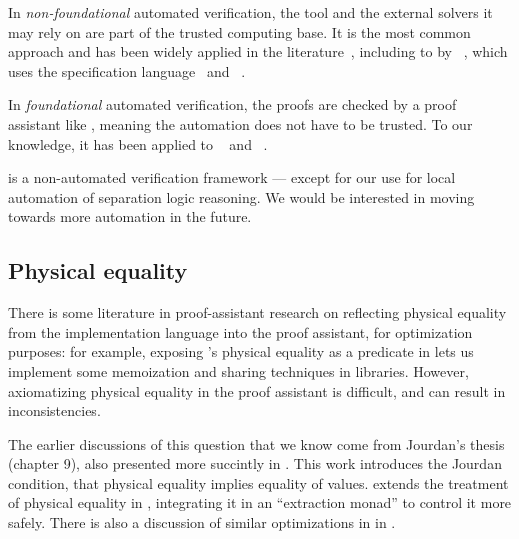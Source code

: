 In \emph{non-foundational} automated verification, the tool and the external solvers it may rely on are part of the trusted computing base.
It is the most common approach and has been widely applied in the literature~\cite{DBLP:journals/jfp/SwamyCFSBY13, DBLP:series/natosec/0001SS17, DBLP:conf/nfm/JacobsSPVPP11, DBLP:conf/icfem/DenisJM22, DBLP:conf/nfm/AstrauskasBFGMM22, DBLP:conf/esop/FilliatreP13, DBLP:journals/pacmpl/LattuadaHCBSZHPH23, DBLP:journals/pacmpl/PulteMSMSK23}, including to \OCaml by \Cameleer~\cite{DBLP:conf/cav/PereiraR20}, which uses the \Gospel specification language~\cite{DBLP:conf/fm/ChargueraudFLP19} and \WhyThree~\cite{DBLP:conf/esop/FilliatreP13}.

In \emph{foundational} automated verification, the proofs are checked by a proof assistant like \Rocq, meaning the automation does not have to be trusted.
To our knowledge, it has been applied to \C~\cite{DBLP:conf/pldi/SammlerLKMD021} and \Rust~\cite{DBLP:journals/pacmpl/GaherSJKD24}.

\Zoo is a non-automated verification framework --- except for our use \Diaframe for local automation of separation logic reasoning. We would be interested in moving towards more automation in the future.

\subsection{Physical equality}
\label{subsec:related-work-physical-equality}

There is some literature in proof-assistant research on reflecting physical equality from the implementation language into the proof assistant, for optimization purposes: for example, exposing \OCaml's physical equality as a predicate in \Rocq lets us implement some memoization and sharing techniques in \Rocq libraries.
%
However, axiomatizing physical equality in the proof assistant is difficult, and can result in inconsistencies.

The earlier discussions of this question that we know come from Jourdan's thesis~\cite{DBLP:phd/hal/Jourdan16} (chapter 9), also presented more succintly in \cite{DBLP:journals/jar/BraibantJM14}.
%
This work introduces the Jourdan condition, that physical equality implies equality of values.
%
\cite{boulme:tel-03356701} extends the treatment of physical equality in \Rocq, integrating it in an ``extraction monad'' to control it more safely.
%
There is also a discussion of similar optimizations in \Lean in \cite{lean-pointer-optimizations}.


